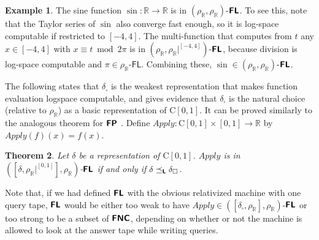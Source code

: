 \documentclass[conference]{IEEEtran}
\newcommand{\R}{\mathbb R}
\newcommand{\classonefont}[1]{\mathsf{#1}}
\newcommand{\classFL}{\classonefont{FL}}
\newcommand{\classtwofont}[1]{\text{\bfseries \sffamily \upshape #1}}
\newcommand{\classFLtwo}{\classtwofont{FL}}
\newcommand{\classFNCtwo}{\classtwofont{FNC}}
\newcommand{\classFPtwo}{\classtwofont{FP}}
\newcommand{\deltabox}{\delta _\square}
\newcommand{\rhoR}{\rho _\R}
\newcommand{\rhoRunit}{\rho _\R|^{[0,1]}}
\newcommand{\classC}{\mathrm C}
\newcommand{\OpApply}{\mathit{Apply}}
\newtheorem{theorem}{Theorem}[section]
\newtheorem{lemma}[theorem]{Lemma}
\theoremstyle{definition}
\newtheorem{example}[theorem]{Example}
\theoremstyle{remark}
\begin{document}


\begin{example}
\label{example: sine}
The sine function $\sin \colon \R \to \R$ is
in $(\rhoR, \rhoR)$-$\classFLtwo$.
To see this, note that 
the Taylor series of $\sin$ also converge fast enough,
so it is log-space computable if restricted to $[-4, 4]$.
The multi-function that computes from $t$
any $x \in [-4, 4]$ with $x \equiv t \bmod 2 \pi$ is
in $(\rhoR, \rhoR|^{[-4,4]})$-$\classFLtwo$, 
because division is log-space computable 
and $\pi \in \rhoR$-$\classFL$. 
Combining these, $\sin \in (\rhoR, \rhoR)$-$\classFLtwo$.
\end{example}

The following states that $\deltabox$ 
is the weakest representation that makes function evaluation 
logspace computable, 
and gives evidence that 
$\deltabox$ is the natural choice (relative to $\rhoR$)
as a basic representation of $\classC [0, 1]$. 
It can be proved similarly to the analogous theorem for $\classFPtwo$ 
\cite{kawamura11:_funct_space_repres_and_polyn_time_comput}. 
Define $\OpApply \colon \classC [0, 1] \times [0, 1] \to \R$ by 
$\OpApply (f) (x) = f (x)$. 

\begin{theorem}
 \label{theorem:apply-is-L-computable}
 Let $\delta$ be a representation of $\classC[0, 1]$.
 $\OpApply$ is in $([\delta, \rhoRunit], \rhoR)$-$\classFLtwo$ if
 and only if $\delta \transL \deltabox$.
\end{theorem}

Note that, 
if we had defined $\classFLtwo$ with the obvious relativized machine with one query tape,
$\classFLtwo$ would be either too weak 
to have $\OpApply \in ([\deltabox,\rhoR], \rhoR)$-$\classFLtwo$ or
too strong to be a subset of $\classFNCtwo$,
depending on whether or not the machine is allowed to look at the answer tape while writing queries.
\end{document}
